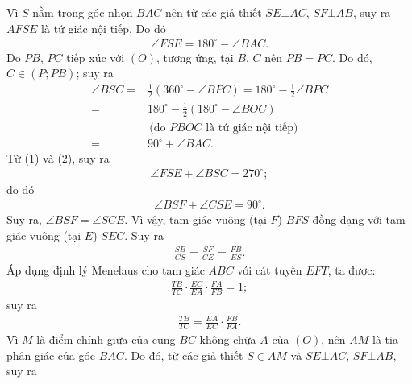 \begin{multicols}{2}
\begin{figure}[H]
		\vspace*{-15pt}
	\end{figure}
	Vì $S$ nằm trong góc nhọn $BAC$ nên từ các giả thiết $SE \bot AC$, $SF \bot AB$, suy ra $AFSE$ là tứ giác nội tiếp. Do đó
	\begin{align*}
		\angle FSE = {180^{\circ}} - \angle BAC. \tag{$1$}
	\end{align*}
	Do $PB$, $PC$ tiếp xúc với $(O)$, tương ứng, tại $B$, $C$ nên $PB = PC$. Do đó, $C \in (P; PB)$; suy ra
	\begin{align*}
		\angle BSC = &\frac{1}{2}\!\left({{{360}^{\circ}} \!-\! \angle BPC} \right) \!=\! {180^{\circ}} \!-\! \frac{1}{2}\angle BPC\\
		= \,&{180^{\circ}} - \frac{1}{2}\left( {{{180}^{\circ}} - \angle BOC} \right)\\
		&\,\text{(do $PBOC$ là tứ giác nội tiếp)}\\
		= \,&{90^{\circ}} + \angle BAC. \tag{$2$}
	\end{align*}
	Từ ($1$) và ($2$), suy ra
	\begin{align*}
		\angle FSE + \angle BSC = {270^{\circ}};
	\end{align*}
	do đó
	\begin{align*}
		\angle BSF + \angle CSE = {90^{\circ}}.
	\end{align*}
	Suy ra,  $\angle BSF = \angle SCE$. Vì vậy, tam giác vuông (tại $F$) $BFS$ đồng dạng với tam giác vuông (tại $E$) $SEC$. Suy ra
	\begin{align*}
		\frac{{SB}}{{CS}} = \frac{{SF}}{{CE}} = \frac{{FB}}{{ES}}. \tag{$3$}
	\end{align*}
	Áp dụng định lý Menelaus cho tam giác $ABC$ với cát tuyến $EFT$, ta được:
	\begin{align*}
		\frac{{TB}}{{TC}} \cdot \frac{{EC}}{{EA}} \cdot \frac{{FA}}{{FB}} = 1;
	\end{align*}
	suy ra
	\begin{align*}
		\frac{{TB}}{{TC}} = \frac{{EA}}{{EC}} \cdot \frac{{FB}}{{FA}}. \tag{$4$}
	\end{align*}
	Vì $M$ là điểm chính giữa của cung $BC$ không chứa $A$ của $(O)$, nên $AM$ là tia phân giác của góc $BAC$. Do đó, từ các giả thiết $S \in AM$ và $SE \bot AC$, $SF \bot AB$, suy ra

\end{multicols}
